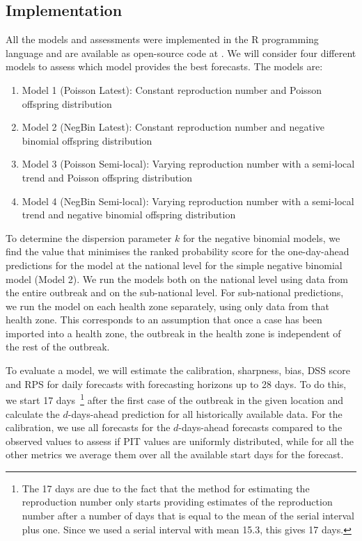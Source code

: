 \documentclass[12pt]{article}
\begin{document}
\subsection{Implementation}
All the models and assessments were implemented in the R programming language \cite{rcoreteamLanguageEnvironmentStatistical2018} and are available as open-source code at \cite{LinkSourceCode}. We will consider four different models to assess which model provides the best forecasts. The models are:

\begin{enumerate}
\item{Model 1 (Poisson Latest): Constant reproduction number and Poisson offspring distribution}
\item{Model 2 (NegBin Latest): Constant reproduction number and negative binomial offspring distribution}
\item{Model 3 (Poisson Semi-local): Varying reproduction number with a semi-local trend and Poisson offspring distribution}
\item{Model 4 (NegBin Semi-local): Varying reproduction number with a semi-local trend and negative binomial offspring distribution}
\end{enumerate}

To determine the dispersion parameter $k$ for the negative binomial models, we find the value that minimises the ranked probability score for the one-day-ahead predictions for the model at the national level for the simple negative binomial model (Model 2). We run the models both on the national level using data from the entire outbreak and on the sub-national level. For sub-national predictions, we run the model on each health zone separately, using only data from that health zone. This corresponds to an assumption that once a case has been imported into a health zone, the outbreak in the health zone is independent of the rest of the outbreak. 

To evaluate a model, we will estimate the calibration, sharpness, bias, DSS score and RPS for daily forecasts with forecasting horizons up to 28 days. To do this, we start 17 days~\footnote{The 17 days are due to the fact that the method for estimating the reproduction number only starts providing estimates of the reproduction number after a number of days that is equal to the mean of the serial interval plus one. Since we used a serial interval with mean 15.3, this gives 17 days.} after the first case of the outbreak in the given location and calculate the $d$-days-ahead prediction for all historically available data. For the calibration, we use all forecasts for the $d$-days-ahead forecasts compared to the observed values to assess if PIT values are uniformly distributed, while for all the other metrics we average them over all the available start days for the forecast.
\end{document}
